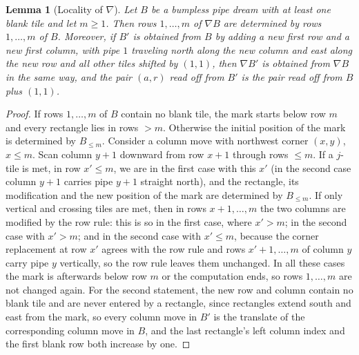 \documentclass{amsart}
\newtheorem{lemma}{Lemma}[subsection]
\theoremstyle{definition}
\theoremstyle{remark}
\numberwithin{equation}{subsection}
\begin{document}
\begin{lemma}[Locality of $\nabla$]\label{lemma:poplocal}
Let $B$ be a bumpless pipe dream with at least one blank tile and let $m\geq 1$. Then rows $1,\ldots,m$ of $\nabla B$ are determined by rows $1,\ldots,m$ of $B$. Moreover, if $B'$ is obtained from $B$ by adding a new first row and a new first column, with pipe $1$ traveling north along the new column and east along the new row and all other tiles shifted by $(1,1)$, then $\nabla B'$ is obtained from $\nabla B$ in the same way, and the pair $(a,r)$ read off from $B'$ is the pair read off from $B$ plus $(1,1)$.
\end{lemma}
\begin{proof}
If rows $1,\ldots,m$ of $B$ contain no blank tile, the mark starts below row $m$ and every rectangle lies in rows $>m$. Otherwise the initial position of the mark is determined by $B_{\leq m}$. Consider a column move with northwest corner $(x,y)$, $x\leq m$. Scan column $y+1$ downward from row $x+1$ through rows $\leq m$. If a $j$-tile is met, in row $x'\leq m$, we are in the first case with this $x'$ (in the second case column $y+1$ carries pipe $y+1$ straight north), and the rectangle, its modification and the new position of the mark are determined by $B_{\leq m}$. If only vertical and crossing tiles are met, then in rows $x+1,\ldots,m$ the two columns are modified by the row rule: this is so in the first case, where $x'>m$; in the second case with $x'>m$; and in the second case with $x'\leq m$, because the corner replacement at row $x'$ agrees with the row rule and rows $x'+1,\ldots,m$ of column $y$ carry pipe $y$ vertically, so the row rule leaves them unchanged. In all these cases the mark is afterwards below row $m$ or the computation ends, so rows $1,\ldots,m$ are not changed again. For the second statement, the new row and column contain no blank tile and are never entered by a rectangle, since rectangles extend south and east from the mark, so every column move in $B'$ is the translate of the corresponding column move in $B$, and the last rectangle's left column index and the first blank row both increase by one.
\end{proof}
\end{document}
